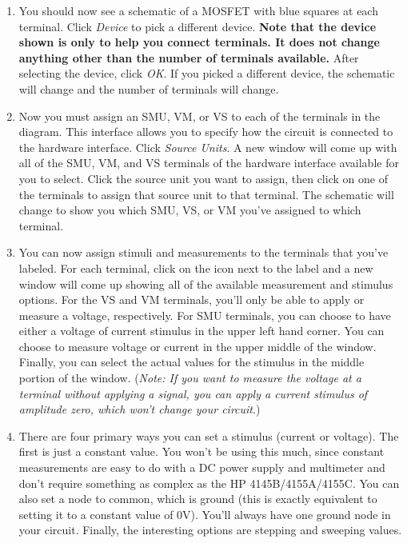 \documentclass{article}
\begin{document}
\begin{enumerate}
  \begin{enumerate}
    \item You should now see a schematic of a MOSFET with blue squares at each terminal. Click \textit{Device} to pick a different device. \textbf{Note that the device shown is only to help you connect terminals. It does not change anything other than the number of terminals available.} After selecting the device, click \textit{OK}. If you picked a different device, the schematic will change and the number of terminals will change.
    \item Now you must assign an SMU, VM, or VS to each of the terminals in the diagram. This interface allows you to specify how the circuit is connected to the hardware interface. Click \textit{Source Units}. A new window will come up with all of the SMU, VM, and VS terminals of the hardware interface available for you to select. Click the source unit you want to assign, then click on one of the terminals to assign that source unit to that terminal. The schematic will change to show you which SMU, VS, or VM you've assigned to which terminal.
    \item You can now assign stimuli and measurements to the terminals that you've labeled. For each terminal, click on the icon next to the label and a new window will come up showing all of the available measurement and stimulus options. For the VS and VM terminals, you'll only be able to apply or measure a voltage, respectively. For SMU terminals, you can choose to have either a voltage of current stimulus in the upper left hand corner. You can choose to measure voltage or current in the upper middle of the window. Finally, you can select the actual values for the stimulus in the middle portion of the window. (\textit{Note: If you want to measure the voltage at a terminal without applying a signal, you can apply a current stimulus of amplitude zero, which won't change your circuit}.)
    \item There are four primary ways you can set a stimulus (current or voltage). The first is just a constant value. You won't be using this much, since constant measurements are easy to do with a DC power supply and multimeter and don't require something as complex as the HP 4145B/4155A/4155C. You can also set a node to common, which is ground (this is exactly equivalent to setting it to a constant value of 0V). You'll always have one ground node in your circuit. Finally, the interesting options are stepping and sweeping values.
      \begin{itemize}

\end{itemize}
\end{enumerate}
\end{enumerate}
\end{document}
